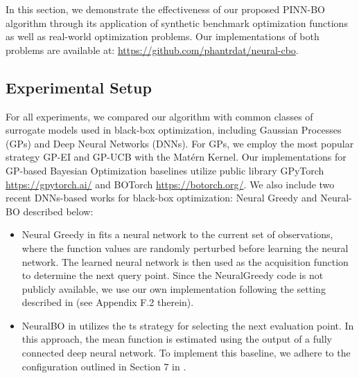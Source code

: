 In this section, we demonstrate the effectiveness of our proposed PINN-BO algorithm through its application of synthetic benchmark optimization functions as well as real-world optimization problems. Our implementations of both problems are available at: \url{https://github.com/phantrdat/neural-cbo}.  

\subsection{Experimental Setup}
\label{section:baselines}
For all experiments, we compared our algorithm with common classes of surrogate models used in black-box optimization, including Gaussian Processes (GPs) and Deep Neural Networks (DNNs). For GPs, we employ the most popular strategy GP-EI \citep{mockus1978application} and GP-UCB \citep{srinivas2009gaussian} with the Mat\'ern Kernel. Our implementations for GP-based Bayesian Optimization baselines utilize public library GPyTorch  \url{https://gpytorch.ai/} and BOTorch \url{https://botorch.org/}. We also include two recent DNNs-based works for black-box optimization: Neural Greedy \citep{pariagreedy} and Neural-BO \citep{phan2023neuralbo} described below:
\begin{itemize}
    \item Neural Greedy in \citet{pariagreedy} fits a neural network to the current set of observations, where the function values are randomly perturbed before learning the neural network. The learned neural network is then used as the acquisition function to determine the next query point. Since the NeuralGreedy code is not publicly available, we use our own implementation following the setting described in     \citet{pariagreedy} (see Appendix F.2 therein).
    \item NeuralBO in \citet{phan2023neuralbo} utilizes the \acl{ts} strategy for selecting the next evaluation point. In this approach, the mean function is estimated using the output of a fully connected deep neural network. To implement this baseline, we adhere to the configuration outlined in Section 7 in \citet{phan2023neuralbo}.
\end{itemize}

